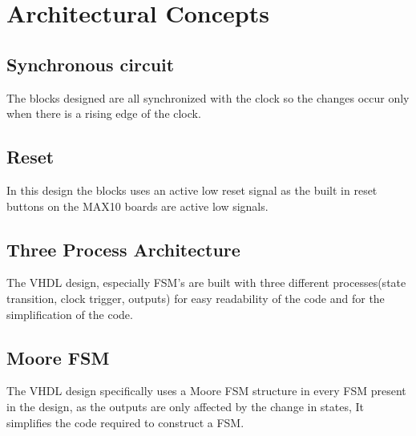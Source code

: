 \documentclass{article}
\begin{document}
\section{Architectural Concepts}
    
    
    \vspace{1.5 cm}

\subsection{Synchronous circuit}

The blocks designed are all synchronized with the clock so the changes occur only when there is a rising edge of the clock.

\vspace{1.5 cm}

\subsection{Reset}
In this design the blocks uses an active low reset signal as the built in reset buttons on the MAX10 boards are active low signals.

\vspace{1.5 cm}

\subsection{Three Process Architecture}
The VHDL design, especially FSM's are built with three different processes(state transition, clock trigger, outputs) for easy readability of the code and for the simplification of the code.
\vspace{1.5 cm}
\subsection{Moore FSM}
The VHDL design specifically uses a Moore FSM structure in every FSM present in the design, as the outputs are only affected by the change in states, It simplifies the code required to construct a FSM.
\newpage


\newpage
\end{document}

